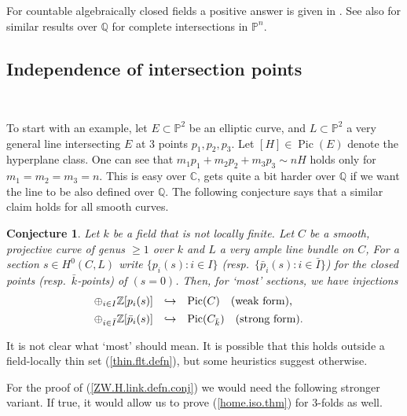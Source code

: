 \documentclass{amsart}
\newtheorem{conj}[thm]{Conjecture}
\theoremstyle{definition}
\theoremstyle{remark}
\renewcommand{\c}[0]{{\mathbb C}}
\newcommand{\z}[0]{{\mathbb Z}}
\newcommand{\p}[0]{{\mathbb P}}
\newcommand{\q}[0]{{\mathbb Q}}
\newcommand{\qtq}[1]{\quad\mbox{#1}\quad}
\newcommand{\pic}[0]{\operatorname{Pic}}
\def\into{\DOTSB\lhook\joinrel\to}
\begin{document}
For countable algebraically closed fields  a positive answer is given in 
\cite{and96, mau-poo, 2018arXiv181006481A, 2018arXiv181006550C}. 
See also \cite{terasoma} for similar results   over $\q$ for complete intersections in $\p^n$. 





\subsection*{Independence of intersection points}{\ }
\medskip

To start with an example, 
let $E\subset \p^2$ be an elliptic curve,  and $L\subset \p^2$ a very general line
intersecting $E$ at 3 points $p_1, p_2, p_3$. Let $[H]\in \pic(E)$ denote the hyperplane class. One can  see that $m_1p_1+m_2p_2+m_3p_3\sim nH$ holds only for $m_1=m_2=m_3=n$.  This is easy over $\c$, gets quite a bit harder over
 $\q$ if we want the line to be also defined over $\q$.
The following conjecture says that a similar claim holds for all smooth curves.



\begin{conj} \label{indep.zeros.conj.0} Let $k$ be a field that is not locally finite.
Let $C$ be a smooth, projective curve  of genus $\geq 1$ over $k$ and 
 $L$  a very ample line bundle on $C$, 
 For a section $s\in H^0(C, L)$
write $\{p_i(s):i\in I\}$ (resp.\  $\{\bar p_i(s):i\in \bar I\}$) for the closed points  (resp.\  $\bar k$-points)   of $(s=0)$.
Then, for `most'  sections, we have injections
$$
\begin{array}{lcl}
\oplus_{i\in I} \z[p_i(s)]  &\into& \pic(C)
\qtq{(weak form),}\\[1ex]
\oplus_{i\in \bar I} \z[\bar p_i(s)] &\into& \pic(C_{\bar k})
\qtq{(strong form).}
\end{array}
$$
\end{conj}

It is not clear what  `most' should mean.  It is possible that 
this holds outside a field-locally thin set (\ref{thin.flt.defn}), but some heuristics suggest otherwise.
 
For the proof of (\ref{ZW.H.link.defn.conj}) we would need the following  stronger variant.
If true, it would  allow us to prove  (\ref{home.iso.thm}) for 3-folds as well.
\end{document}
